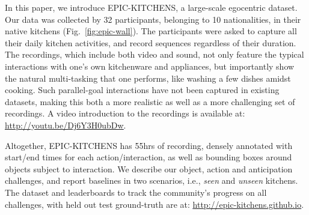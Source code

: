 \documentclass[runningheads]{llncs}
\newcommand{\EPIC}{\textcolor{EPIC-COLOR}{{EPIC-KITCHENS}}}
\begin{document}
In this paper, we introduce \EPIC{}, a  large-scale egocentric dataset. Our data was collected by 32 participants, belonging to 10 nationalities, in their native kitchens (Fig.~\ref{fig:epic-wall}). The participants were asked to capture all their daily kitchen activities, and record sequences regardless of their duration. The recordings, which include both video and sound, not only feature the typical interactions with one's own kitchenware and appliances, but importantly show the natural multi-tasking that one performs, like washing a few dishes amidst cooking. Such parallel-goal interactions have not been captured in existing datasets, making this both a more realistic as well as a more challenging set of recordings.
A video introduction to the recordings is available at: \textcolor{blue}{\underline{\url{http://youtu.be/Dj6Y3H0ubDw}}}.

\vspace*{6pt}
 
Altogether, \EPIC{} has 55hrs of recording, densely annotated with start/end times for each action/interaction, as well as bounding boxes around objects subject to interaction. We describe our object, action and anticipation challenges, and report baselines in two scenarios, i.e., \textit{seen} and \textit{unseen} kitchens. The dataset and leaderboards to track the community's progress on all challenges, with held out test ground-truth are at: \textcolor{blue}{\underline{\url{http://epic-kitchens.github.io}}}.
\end{document}
